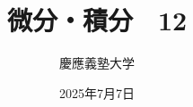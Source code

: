 \documentclass[dvipdfmx,cjk,10.2pt]{beamer}
\theoremstyle{definition}
\begin{document}
\title{微分・積分　12} 
\author{慶應義塾大学}            %
\date{2025年7月7日}
\maketitle
















\end{document}

